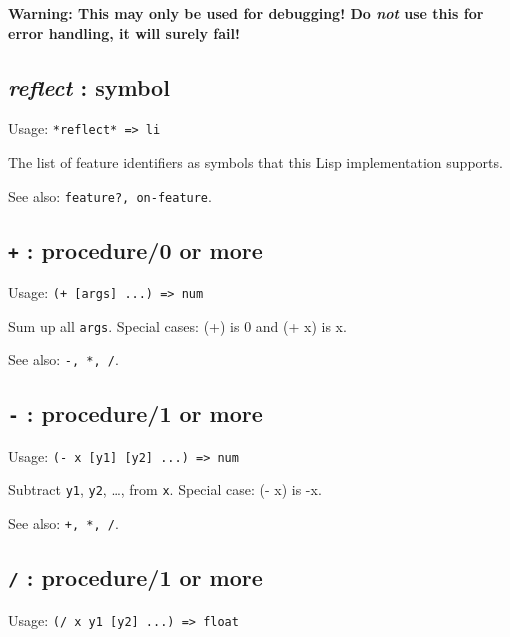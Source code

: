 \documentclass[
]{article}
\newcommand{\passthrough}[1]{#1}
\begin{document}
\textbf{Warning: This may only be used for debugging! Do \emph{not} use
this for error handling, it will surely fail!}

\hypertarget{reflect-symbol-1}{%
\subsection{\texorpdfstring{\emph{reflect} :
symbol}{reflect : symbol}}\label{reflect-symbol-1}}

Usage: \passthrough{\lstinline!*reflect* => li!}

The list of feature identifiers as symbols that this Lisp implementation
supports.

See also: \passthrough{\lstinline!feature?, on-feature!}.

\hypertarget{procedure0-or-more-3}{%
\subsection{\texorpdfstring{\texttt{+} : procedure/0 or
more}{+ : procedure/0 or more}}\label{procedure0-or-more-3}}

Usage: \passthrough{\lstinline!(+ [args] ...) => num!}

Sum up all \passthrough{\lstinline!args!}. Special cases: (+) is 0 and
(+ x) is x.

See also: \passthrough{\lstinline!-, *, /!}.

\hypertarget{procedure1-or-more-2}{%
\subsection{\texorpdfstring{\texttt{-} : procedure/1 or
more}{- : procedure/1 or more}}\label{procedure1-or-more-2}}

Usage: \passthrough{\lstinline!(- x [y1] [y2] ...) => num!}

Subtract \passthrough{\lstinline!y1!}, \passthrough{\lstinline!y2!},
\ldots, from \passthrough{\lstinline!x!}. Special case: (- x) is -x.

See also: \passthrough{\lstinline!+, *, /!}.

\hypertarget{procedure1-or-more-3}{%
\subsection{\texorpdfstring{\texttt{/} : procedure/1 or
more}{/ : procedure/1 or more}}\label{procedure1-or-more-3}}

Usage: \passthrough{\lstinline!(/ x y1 [y2] ...) => float!}
\end{document}
